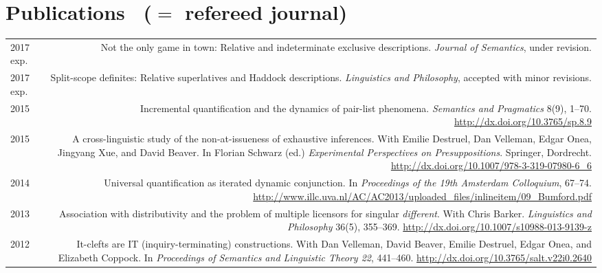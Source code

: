 \documentclass[12pt]{article}
\newcommand{\doi}[1]{\url{http://dx.doi.org/#1}}
\begin{document}
\bigskip

\section*{Publications \ \textrm{(\textdagger ${}={}$ refereed journal)}} 

\begin{longtable}{LR}
  2017 exp. & Not the only game in town: Relative and indeterminate exclusive
              descriptions. \textit{Journal of Semantics}, under revision.\\
  2017 exp. & Split-scope definites: Relative superlatives and Haddock
              descriptions. \textit{Linguistics and Philosophy}, accepted with
              minor revisions.\\
  2015  & Incremental quantification and the dynamics of pair-list phenomena.
          \textit{Semantics and Pragmatics} 8(9), 1--70.
          \doi{10.3765/sp.8.9}\\
  2015  & A cross-linguistic study of the non-at-issueness of exhaustive
          inferences. With Emilie Destruel, Dan Velleman, Edgar Onea, Jingyang
          Xue, and David Beaver.  In Florian Schwarz (ed.)
          \textit{Experimental Perspectives on Presuppositions}. Springer,
          Dordrecht. \doi{10.1007/978-3-319-07980-6_6}\\ %
  2014  & Universal quantification as iterated dynamic conjunction. In
          \textit{Proceedings of the 19th Amsterdam Colloquium}, 67--74.
          \url{http://www.illc.uva.nl/AC/AC2013/uploaded_files/inlineitem/09_Bumford.pdf}\\
  2013  & Association with distributivity and the problem of multiple
          licensors for singular \textit{different}. With Chris Barker.
          \textit{Linguistics and Philosophy} 36(5), 355--369.
          \doi{10.1007/s10988-013-9139-z}\\ %
  2012  & It-clefts are IT (inquiry-terminating) constructions. With Dan
          Velleman, David Beaver, Emilie Destruel, Edgar Onea, and Elizabeth
          Coppock. In \textit{Proceedings of Semantics and Linguistic Theory
          22}, 441--460. \doi{10.3765/salt.v22i0.2640}
\end{longtable}
\end{document}
